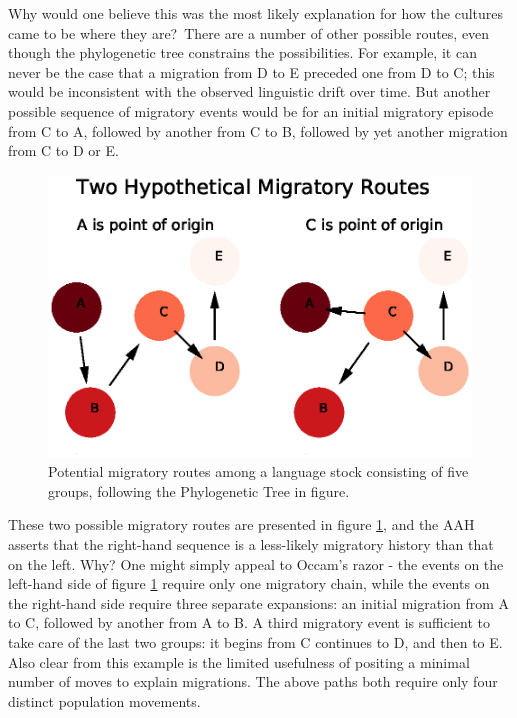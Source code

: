 \documentclass[11pt]{article}
\begin{document}
Why would one believe this was the most likely explanation for how the cultures came to be where they are?\ There are a number of other possible routes, even though the phylogenetic tree constrains the possibilities. For example, it can never be the case that a migration from D to E preceded one from D to C; this would be inconsistent with the observed linguistic drift over time. But another possible  sequence of migratory events would be for an initial migratory episode from C to A, followed by another from C to B, followed by yet another migration from C to D or E.

\begin{figure}
\begin{center} 
\includegraphics[width=\textwidth]{AncillaryFiles//figure2.eps} 
\caption{Potential migratory routes among a language stock consisting of five groups, following the Phylogenetic Tree in figure.} \label{fig2}
\end{center} 
\end{figure}

These two possible migratory routes are presented in figure \ref{fig2}, and the AAH asserts that the right-hand sequence is a less-likely migratory history than that on the left. Why? One might simply appeal to Occam's razor - the events on the left-hand side of figure \ref{fig2} require only one migratory chain, while the events on the right-hand side require three separate expansions: an initial migration from A to C, followed by another from A to B. A third migratory event is sufficient to take care of the last two groups: it begins from C continues to D, and then to E. Also clear from this example is the limited usefulness of positing a minimal number of moves to explain migrations. The above paths both require only four distinct population movements.  
\end{document}
